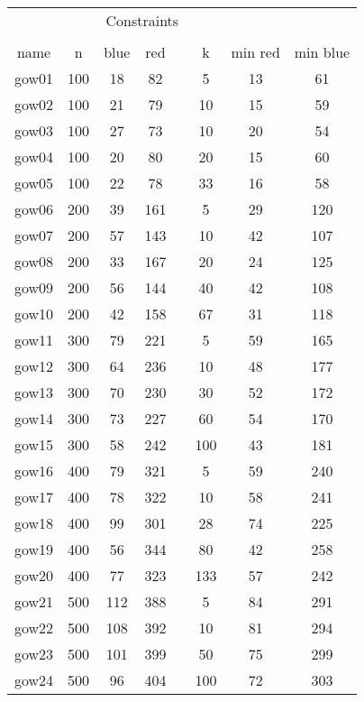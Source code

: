 \begin{table}[H]
    \centering
    \scriptsize
    \begin{tabular}{cccccccc}
        \firsthline
        \multicolumn{4}{c}{Graph Details} & & \multicolumn{3}{c}{Constraints}\\
        \cline{1-4} \cline{6-8}\\
         name &  n & blue & red & & k & min red & min blue\\
         \hline
        gow01 & 100 & 18 & 82 & & 5 & 13 & 61\\
        gow02 & 100 & 21 & 79 & & 10 & 15 & 59\\
        gow03 & 100 & 27 & 73 & & 10 & 20 & 54\\
        gow04 & 100 & 20 & 80 & & 20 & 15 & 60\\
        gow05 & 100 & 22 & 78 & & 33 & 16 & 58\\
        gow06 & 200 & 39 & 161 & & 5 & 29 & 120\\
        gow07 & 200 & 57 & 143 & & 10 & 42 & 107\\
        gow08 & 200 & 33 & 167 & & 20 & 24 & 125\\
        gow09 & 200 & 56 & 144 & & 40 & 42 & 108\\
        gow10 & 200 & 42 & 158 & & 67 & 31 & 118\\
        gow11 & 300 & 79 & 221 & & 5 & 59 & 165\\
        gow12 & 300 & 64 & 236 & & 10 & 48 & 177\\
        gow13 & 300 & 70 & 230 & & 30 & 52 & 172\\
        gow14 & 300 & 73 & 227 & & 60 & 54 & 170\\
        gow15 & 300 & 58 & 242 & & 100 & 43 & 181\\
        gow16 & 400 & 79 & 321 & & 5 & 59 & 240\\
        gow17 & 400 & 78 & 322 & & 10 & 58 & 241\\
        gow18 & 400 & 99 & 301 & & 28 & 74 & 225\\
        gow19 & 400 & 56 & 344 & & 80 & 42 & 258\\
        gow20 & 400 & 77 & 323 & & 133 & 57 & 242\\
        gow21 & 500 & 112 & 388 & & 5 & 84 & 291\\
        gow22 & 500 & 108 & 392 & & 10 & 81 & 294\\
        gow23 & 500 & 101 & 399 & & 50 & 75 & 299\\
        gow24 & 500 & 96 & 404 & & 100 & 72 & 303\\

\end{tabular}
\end{table}
